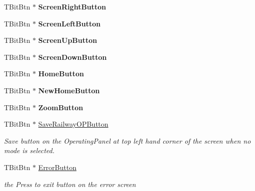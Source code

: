 \begin{DoxyCompactItemize}
T\+Bit\+Btn $\ast$ {\bfseries Screen\+Right\+Button}
\item 
\mbox{\label{class_t_interface_a3a75b7b46efe28fca34705594393ded4}} 
T\+Bit\+Btn $\ast$ {\bfseries Screen\+Left\+Button}
\item 
\mbox{\label{class_t_interface_aebeecba47338839d28b2d5cc1ab6a82d}} 
T\+Bit\+Btn $\ast$ {\bfseries Screen\+Up\+Button}
\item 
\mbox{\label{class_t_interface_a4ea577487a0d8e403880a1ce587feaed}} 
T\+Bit\+Btn $\ast$ {\bfseries Screen\+Down\+Button}
\item 
\mbox{\label{class_t_interface_af1bddcfade17241d66f1247c18d5b65d}} 
T\+Bit\+Btn $\ast$ {\bfseries Home\+Button}
\item 
\mbox{\label{class_t_interface_a32266e7f365a32bd5f135a285fffc7a8}} 
T\+Bit\+Btn $\ast$ {\bfseries New\+Home\+Button}
\item 
\mbox{\label{class_t_interface_a94e5fcaf5fa82c8f1672ac86d76bbea1}} 
T\+Bit\+Btn $\ast$ {\bfseries Zoom\+Button}
\item 
\mbox{\label{class_t_interface_a17ebaee4a02bfe87df1c2c2dd752f9cf}} 
T\+Bit\+Btn $\ast$ \mbox{\hyperlink{class_t_interface_a17ebaee4a02bfe87df1c2c2dd752f9cf}{Save\+Railway\+O\+P\+Button}}
\begin{DoxyCompactList}\small\item\em Save button on the Operating\+Panel at top left hand corner of the screen when no mode is selected. \end{DoxyCompactList}\item 
\mbox{\label{class_t_interface_a4fab2d2cef5cefbdc6e2cbdbc18e3c20}} 
T\+Bit\+Btn $\ast$ \mbox{\hyperlink{class_t_interface_a4fab2d2cef5cefbdc6e2cbdbc18e3c20}{Error\+Button}}
\begin{DoxyCompactList}\small\item\em the \textquotesingle{}Press to exit\textquotesingle{} button on the error screen \end{DoxyCompactList}\item 
\mbox{\label{class_t_interface_a489447de6f443efcfcba7506b420e59f}} 

\end{DoxyCompactItemize}
